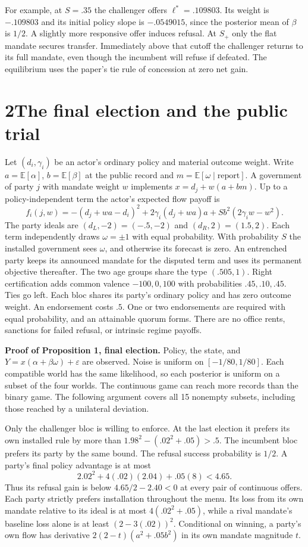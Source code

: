 \documentclass[11pt,letterpaper]{article}
\newcommand{\EE}{\mathbb E}
\begin{document}
For example, at $S=.35$ the challenger offers $\ell^*=.109803$. Its weight is $-.109803$ and its initial policy slope is $-.0549015$, since the posterior mean of $\beta$ is $1/2$. A slightly more responsive offer induces refusal. At $S_+$ only the flat mandate secures transfer. Immediately above that cutoff the challenger returns to its full mandate, even though the incumbent will refuse if defeated. The equilibrium uses the paper's tie rule of concession at zero net gain.

\newpage
\section*{2\quad The final election and the public trial}
Let $(d_i,\gamma_i)$ be an actor's ordinary policy and material outcome weight. Write $a=\EE[\alpha]$, $b=\EE[\beta]$ at the public record and $m=\EE[\omega\mid\text{report}]$. A government of party $j$ with mandate weight $w$ implements $x=d_j+ w(a+bm)$. Up to a policy-independent term the actor's expected flow payoff is
\[
 f_i(j,w)=-(d_j+wa-d_i)^2+2\gamma_i(d_j+wa)a+Sb^2(2\gamma_i w-w^2).
\]
The party ideals are $(d_L,-2)=(-.5,-2)$ and $(d_R,2)=(1.5,2)$. Each term independently draws $\omega=\pm1$ with equal probability. With probability $S$ the installed government sees $\omega$, and otherwise its forecast is zero. An entrenched party keeps its announced mandate for the disputed term and uses its permanent objective thereafter. The two age groups share the type $(.505,1)$. Right certification adds common valence $-100,0,100$ with probabilities $.45,.10,.45$. Ties go left. Each bloc shares its party's ordinary policy and has zero outcome weight. An endorsement costs $.5$. One or two endorsements are required with equal probability, and an attainable quorum forms. There are no office rents, sanctions for failed refusal, or intrinsic regime payoffs.

\textbf{Proof of Proposition 1, final election.} Policy, the state, and $Y=x(\alpha+\beta\omega)+\varepsilon$ are observed. Noise is uniform on $[-1/80,1/80]$. Each compatible world has the same likelihood, so each posterior is uniform on a subset of the four worlds. The continuous game can reach more records than the binary game. The following argument covers all 15 nonempty subsets, including those reached by a unilateral deviation.

Only the challenger bloc is willing to enforce. At the last election it prefers its own installed rule by more than $1.98^2-(.02^2+.05)>.5$. The incumbent bloc prefers its party by the same bound. The refusal success probability is $1/2$. A party's final policy advantage is at most
\[
       2.02^2+ 4(.02)(2.04)+ .05(8)<4.65 .
\]
Thus its refusal gain is below $4.65/2-2.40<0$ at every pair of continuous offers. Each party strictly prefers installation throughout the menu. Its loss from its own mandate relative to its ideal is at most $4(.02^2+.05)$, while a rival mandate's baseline loss alone is at least $(2-3(.02))^2$. Conditional on winning, a party's own flow has derivative $2(2-t)(a^2+.05b^2)$ in its own mandate magnitude $t$.
\end{document}
